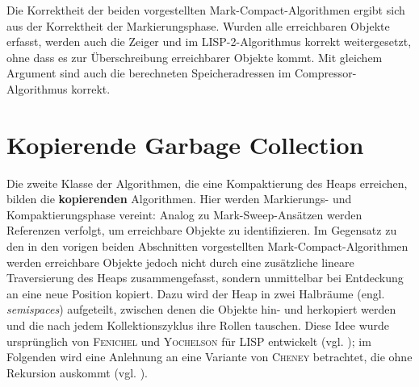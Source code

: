 Die Korrektheit der beiden vorgestellten Mark-Compact-Algorithmen ergibt sich aus der Korrektheit der Markierungsphase.
Wurden alle erreichbaren Objekte erfasst, werden auch die Zeiger  und  im LISP-2-Algorithmus korrekt weitergesetzt, ohne dass es zur Überschreibung erreichbarer Objekte kommt.
Mit gleichem Argument sind auch die berechneten Speicheradressen im Compressor-Algorithmus korrekt.




\section{Kopierende Garbage Collection}
\label{sec:copying}
Die zweite Klasse der Algorithmen, die eine Kompaktierung des Heaps erreichen, bilden die \textbf{kopierenden} Algorithmen.
Hier werden Markierungs- und Kompaktierungsphase vereint:
Analog zu Mark-Sweep-Ansätzen werden Referenzen verfolgt, um erreichbare Objekte zu identifizieren.
Im Gegensatz zu den in den vorigen beiden Abschnitten vorgestellten Mark-Compact-Algorithmen werden erreichbare Objekte jedoch nicht durch eine zusätzliche lineare Traversierung des Heaps zusammengefasst, sondern unmittelbar bei Entdeckung an eine neue Position kopiert.
Dazu wird der Heap in zwei Halbräume (engl. \textit{semispaces}) aufgeteilt, zwischen denen die Objekte hin- und herkopiert werden und die nach jedem Kollektionszyklus ihre Rollen tauschen.
Diese Idee wurde ursprünglich von \textsc{Fenichel} und \textsc{Yochelson} für LISP entwickelt (vgl. \cite{fenichel1969}); im Folgenden wird eine Anlehnung an eine Variante von \textsc{Cheney} betrachtet, die ohne Rekursion auskommt (vgl. \cite{cheney1970}).


